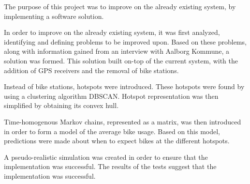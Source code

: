 The purpose of this project was to improve on the already existing \citybike system, by implementing a software solution.

In order to improve on the already existing \citybike system, it was first analyzed, identifying and defining problems to be improved upon.
Based on these problems, along with information gained from an interview with Aalborg Kommune, a solution was formed.
This solution built on-top of the current \citybike system, with the addition of GPS receivers and the removal of bike stations.

Instead of bike stations, hotspots were introduced.
These hotspots were found by using a clustering algorithm DBSCAN.
Hotspot representation was then simplified by obtaining its convex hull.

Time-homogenous Markov chains, represented as a matrix, was then introduced in order to form a model of the average bike usage.
Based on this model, predictions were made about when to expect bikes at the different hotspots.

A pseudo-realistic simulation was created in order to ensure that the implementation was successful.
The results of the tests suggest that the implementation was successful.